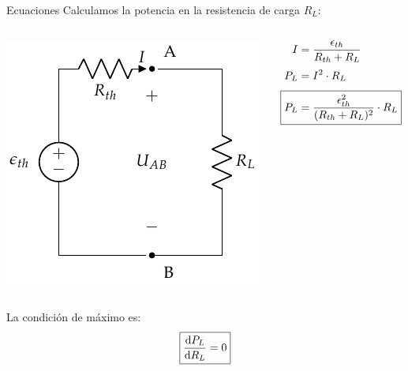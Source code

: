\documentclass[aspectratio=169, xcolor={usenames,svgnames,dvipsnames}]{beamer}
\begin{document}
\begin{frame}{Ecuaciones}
    \vspace{2mm}
    Calculamos la \alert{potencia en la resistencia} de carga \(R_L\):
    \begin{columns}
    \begin{column}{0.45\columnwidth}
    \begin{center}
    \includegraphics[height=0.52\textheight]{../figs/EquivalenteThevenin0_R.pdf}
    \end{center}
    \end{column}
    
    \begin{column}{0.45\columnwidth}
    \begin{align*}
    I &= \frac{\epsilon_{th}}{R_{th} + R_L}\\[3pt]
    P_L &= I^2 \cdot R_L\\[3pt]
    \Aboxed{P_L &= \frac{\epsilon^2_{th}}{(R_{th} + R_L)^2} \cdot R_L}
    \end{align*}
    \end{column}
    \end{columns}

    \vspace{5mm}
    La \alert{condición} de \alert{máximo} es:
    \[
      \boxed{%
        \diff{P_L}{R_L} = 0%
      }
    \]
\end{frame}

\end{document}
